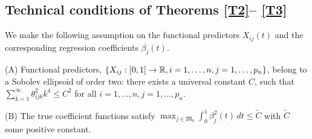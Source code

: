 \documentclass[aos,MSNbibl,dvips]{arximspdf}
\newcommand{\btheta}{\bolds\theta}
\newcommand{\bfeta}{\bolds\eta}
\def\RR{\mathbb{R}}
\newcommand{\Mfrak}{\mathfrak{M}}
\begin{document}
\begin{appendix}
\section{Technical conditions of Theorems \texorpdfstring{\protect\ref{T2}--\protect
\ref{T3}}{1--2}}\label{linearCon}
\label{appb}

We make the following assumption on the functional predictors
$X_{ij}(t)$ and the corresponding regression coefficients $\beta_j(t)$.

\begin{assumption}\label{as3}
\textup{(A)} Functional predictors, $\{X_{ij}:[0,1]\rightarrow\RR,
i=1,\ldots,n, \break j=1,\ldots,{p_n}\}$, belong to a Sobolev ellipsoid of
order two: there exists a universal constant $C$, such that $\sum
_{k=1}^{\infty} \theta^2_{ijk}k^4\le C^2$ for all $i=1,\ldots,n,
j=1,\ldots,{p_n}$.

(B) The true coefficient functions satisfy $\max_{ j\in\Mfrak
_0}\int_0^1\beta^2_j(t)\,dt \leq\widetilde C$ with $\widetilde C$ some
positive constant.
\end{assumption}

%


\end{appendix}
\end{document}
